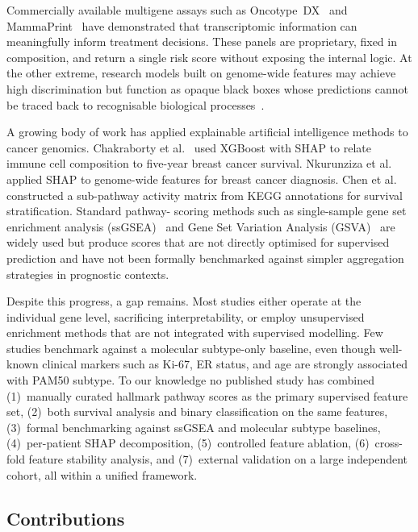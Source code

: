 \documentclass[review,12pt]{elsarticle}
\begin{document}
Commercially available multigene assays such as Oncotype~DX~\citep{paik2004}
and MammaPrint~\citep{vantveer2002,cardoso2016} have demonstrated that
transcriptomic information can meaningfully inform treatment decisions.
These panels are proprietary, fixed in composition, and return a single
risk score without exposing the internal logic.  At the other extreme,
research models built on genome-wide features may achieve high
discrimination but function as opaque black boxes whose predictions
cannot be traced back to recognisable biological processes~\citep{rudin2019}.

A growing body of work has applied explainable artificial intelligence
methods to cancer genomics.  Chakraborty et al.~\citep{chakraborty2021}
used XGBoost with SHAP to relate immune cell composition to five-year
breast cancer survival.  Nkurunziza et al.~\citep{nature2025shap} applied
SHAP to genome-wide features for breast cancer diagnosis.
Chen et al.~\citep{chen2021pathway} constructed a sub-pathway activity matrix
from KEGG annotations for survival stratification.  Standard pathway-
scoring methods such as single-sample gene set enrichment analysis
(ssGSEA)~\citep{barbie2009} and Gene Set Variation Analysis
(GSVA)~\citep{hanzelmann2013} are widely used but produce scores that are
not directly optimised for supervised prediction and have not been
formally benchmarked against simpler aggregation strategies in prognostic
contexts.

Despite this progress, a gap remains.  Most studies either operate at
the individual gene level, sacrificing interpretability, or employ
unsupervised enrichment methods that are not integrated with supervised
modelling.  Few studies benchmark against a molecular subtype-only
baseline, even though well-known clinical markers such as Ki-67,
ER status, and age are strongly associated with PAM50 subtype.  To our
knowledge no published study has combined (1)~manually curated hallmark
pathway scores as the primary supervised feature set, (2)~both survival
analysis and binary classification on the same features, (3)~formal
benchmarking against ssGSEA and molecular subtype baselines,
(4)~per-patient SHAP decomposition, (5)~controlled feature ablation,
(6)~cross-fold feature stability analysis, and (7)~external validation
on a large independent cohort, all within a unified framework.

\subsection{Contributions}
\label{sec:contributions}
\end{document}
